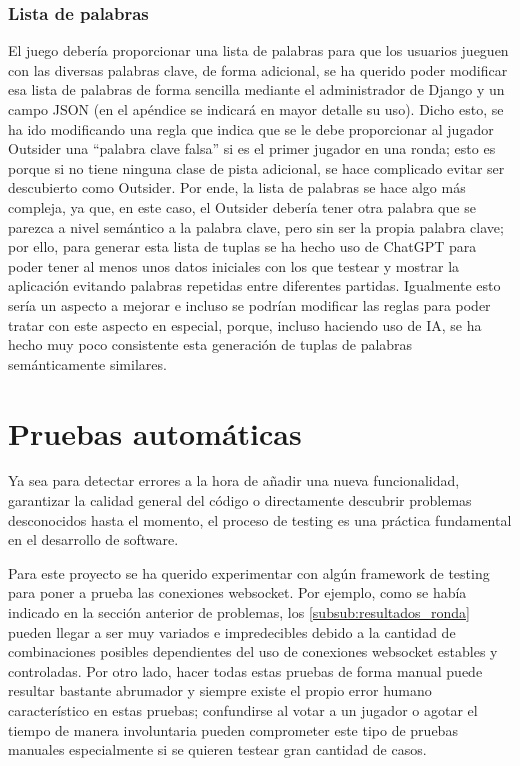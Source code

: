 \subsubsection{Lista de palabras}
El juego debería proporcionar una lista de palabras para que los usuarios jueguen con las 
diversas palabras clave, de forma adicional, se ha querido poder modificar esa lista de palabras de forma sencilla mediante el administrador de Django y un campo JSON (en el apéndice se indicará en mayor detalle su uso).
Dicho esto, se ha ido modificando una regla que indica que se le debe proporcionar al jugador Outsider una ``palabra clave falsa'' si es el primer jugador en una ronda; esto es porque si 
no tiene ninguna clase de pista adicional, se hace complicado evitar ser descubierto como Outsider. Por ende, la lista de palabras se hace algo más compleja, ya que, en este caso, el Outsider
debería tener otra palabra que se parezca a nivel semántico a la palabra clave, pero sin ser la propia palabra clave; por ello, para generar esta lista de tuplas se ha hecho uso de ChatGPT \cite{ChatGPT} para
poder tener al menos unos datos iniciales con los que testear y mostrar la aplicación evitando palabras repetidas entre diferentes partidas. Igualmente esto sería un aspecto a mejorar e incluso
se podrían modificar las reglas para poder tratar con este aspecto en especial, porque, incluso haciendo uso de IA, se ha hecho muy poco consistente esta generación de tuplas de palabras semánticamente similares.



\section{Pruebas automáticas}

Ya sea para detectar errores a la hora de añadir una nueva funcionalidad, garantizar la calidad general del código o directamente
descubrir problemas desconocidos hasta el momento, el proceso de testing es una práctica fundamental en el desarrollo de
software.

Para este proyecto se ha querido experimentar con algún framework de testing para poner a prueba las conexiones websocket. Por ejemplo, como se había indicado
en la sección anterior de problemas, los \ref{subsub:resultados_ronda} pueden llegar a ser muy variados e impredecibles debido a la cantidad de combinaciones
posibles dependientes del uso de conexiones websocket estables y controladas. Por otro lado, hacer todas estas pruebas de forma manual puede resultar 
bastante abrumador y siempre existe el propio error humano característico en estas pruebas; confundirse al votar a un jugador o agotar el tiempo de manera
involuntaria pueden comprometer este tipo de pruebas manuales especialmente si se quieren testear gran cantidad de casos.

